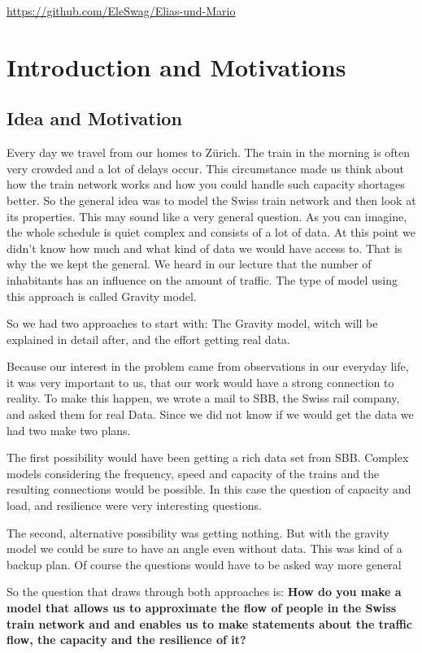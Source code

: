 \documentclass[11pt]{article}
\begin{document}
\url{https://github.com/EleSwag/Elias-und-Mario}

\section{Introduction and Motivations}

\subsection{Idea and Motivation}


Every day we travel from our homes to Z\"urich. The train in the morning is often very crowded and a lot of delays occur. This circumstance made us think about how the train network works and how you could handle such capacity shortages better. 
So the general idea was to model the Swiss train network and then look at its properties. This may sound like a very general question. As you can imagine, the whole schedule is quiet complex and consists of a lot of data. At this point we didn't know how much and what kind of data we would have access to. That is why the we kept the general. We heard in our lecture that the number of inhabitants has an influence on the amount of traffic. The type of model using this approach is called Gravity model.

So we had two approaches to start with: The Gravity model, witch will be explained in detail after, and the effort getting real data.

Because our interest in the problem came from observations in our everyday life, it was very important to us, that our work would have a strong connection to reality. To make this happen, we wrote a mail to SBB, the Swiss rail company, and asked them for real Data. Since we did not know if we would get the data we had two make two plans.

The first possibility would have been getting a rich data set from SBB. Complex models considering the frequency, speed and capacity of the trains and the resulting connections would be possible. In this case the question of capacity and load, and resilience were very interesting questions.

The second, alternative possibility was getting nothing. But with the gravity model we could be sure to have an angle even  without data. This was kind of a backup plan. Of course the questions would have to be asked way more general  

So the question that draws through both approaches is:\newline 
\textbf{How do you make a model that allows us to approximate the flow of people in the Swiss train network and and enables us to make statements about the traffic flow, the capacity and the resilience of it?}    
\end{document}
